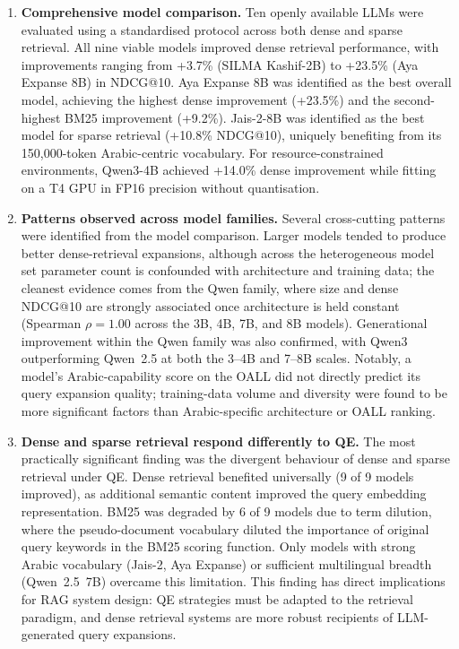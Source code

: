 \begin{enumerate}[label=\roman*.]
    \item \textbf{Comprehensive model comparison.} Ten openly available LLMs were evaluated using a standardised protocol across both dense and sparse retrieval. All nine viable models improved dense retrieval performance, with improvements ranging from +3.7\% (SILMA Kashif-2B) to +23.5\% (Aya Expanse 8B) in NDCG@10. Aya Expanse 8B was identified as the best overall model, achieving the highest dense improvement (+23.5\%) and the second-highest BM25 improvement (+9.2\%). Jais-2-8B was identified as the best model for sparse retrieval (+10.8\% NDCG@10), uniquely benefiting from its 150,000-token Arabic-centric vocabulary. For resource-constrained environments, Qwen3-4B achieved +14.0\% dense improvement while fitting on a T4 GPU in FP16 precision without quantisation.
    \item \textbf{Patterns observed across model families.} Several cross-cutting patterns were identified from the model comparison. Larger models tended to produce better dense-retrieval expansions, although across the heterogeneous model set parameter count is confounded with architecture and training data; the cleanest evidence comes from the Qwen family, where size and dense NDCG@10 are strongly associated once architecture is held constant (Spearman $\rho = 1.00$ across the 3B, 4B, 7B, and 8B models). Generational improvement within the Qwen family was also confirmed, with Qwen3 outperforming Qwen~2.5 at both the 3--4B and 7--8B scales. Notably, a model's Arabic-capability score on the OALL did not directly predict its query expansion quality; training-data volume and diversity were found to be more significant factors than Arabic-specific architecture or OALL ranking.
    \item \textbf{Dense and sparse retrieval respond differently to QE.} The most practically significant finding was the divergent behaviour of dense and sparse retrieval under QE. Dense retrieval benefited universally (9 of 9 models improved), as additional semantic content improved the query embedding representation. BM25 was degraded by 6 of 9 models due to term dilution, where the pseudo-document vocabulary diluted the importance of original query keywords in the BM25 scoring function. Only models with strong Arabic vocabulary (Jais-2, Aya Expanse) or sufficient multilingual breadth (Qwen~2.5~7B) overcame this limitation. This finding has direct implications for RAG system design: QE strategies must be adapted to the retrieval paradigm, and dense retrieval systems are more robust recipients of LLM-generated query expansions.

\end{enumerate}
